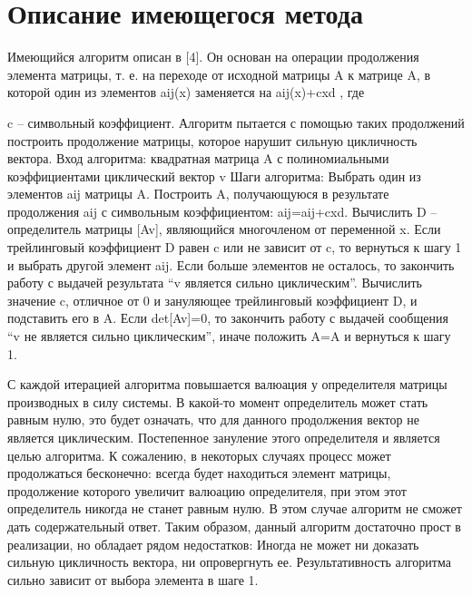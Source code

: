 \section{Описание имеющегося метода}

Имеющийся алгоритм описан в [4]. Он основан на операции продолжения элемента матрицы, т. е. на переходе от исходной матрицы A к матрице A, в которой один из элементов aij(x) заменяется на aij(x)+cxd , где

c – символьный коэффициент. Алгоритм пытается с помощью таких продолжений построить продолжение матрицы, которое нарушит сильную цикличность вектора.
Вход алгоритма:
квадратная матрица A с полиномиальными коэффициентами
циклический вектор v
Шаги алгоритма:
Выбрать один из элементов aij матрицы A.
Построить A, получающуюся в результате продолжения aij с символьным коэффициентом: aij=aij+cxd.
Вычислить D – определитель матрицы [Av], являющийся многочленом от переменной x. Если трейлинговый коэффициент D равен c или не зависит от c, то вернуться к шагу 1 и выбрать другой элемент aij. Если больше элементов не осталось, то закончить работу с выдачей результата “v является сильно циклическим”.
Вычислить значение c, отличное от 0 и зануляющее трейлинговый коэффициент D, и подставить его в A.
Если det[Av]=0, то закончить работу с выдачей сообщения “v не является сильно циклическим”, иначе положить A=A и вернуться к шагу 1.

С каждой итерацией алгоритма повышается валюация у определителя матрицы производных в силу системы. В какой-то момент определитель может стать равным нулю, это будет означать, что для данного продолжения вектор не является циклическим. Постепенное зануление этого определителя и является целью алгоритма. К сожалению, в некоторых случаях процесс может продолжаться бесконечно: всегда будет находиться элемент матрицы, продолжение которого увеличит валюацию определителя, при этом этот определитель никогда не станет равным нулю. В этом случае алгоритм не сможет дать содержательный ответ.
Таким образом, данный алгоритм достаточно прост в реализации, но обладает рядом недостатков:
Иногда не может ни доказать сильную цикличность вектора, ни опровергнуть ее.
Результативность алгоритма сильно зависит от выбора элемента в шаге 1.
